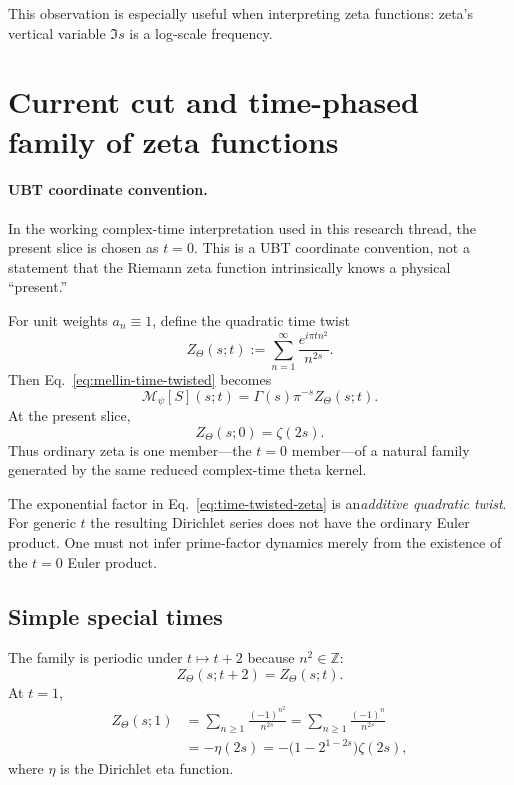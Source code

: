 This observation is especially useful when interpreting zeta functions: zeta's vertical
variable $\Im s$ is a log-scale frequency.

\section{Current cut and time-phased family of zeta functions}
\label{sec:time-twisted-zeta}

\paragraph{UBT coordinate convention.}
In the working complex-time interpretation used in this research thread, the present
slice is chosen as $t=0$.  This is a UBT coordinate convention, not a statement that the
Riemann zeta function intrinsically knows a physical ``present.''

For unit weights $a_n\equiv1$, define the quadratic time twist
\begin{equation}
  Z_\Theta(s;t)
  :=\sum_{n=1}^{\infty}
    \frac{e^{i\pi t n^2}}{n^{2s}}.
  \label{eq:time-twisted-zeta}
\end{equation}
Then Eq.~\eqref{eq:mellin-time-twisted} becomes
\begin{equation}
 \boxed{
  \mathcal M_\psi[S](s;t)
  =\Gamma(s)\pi^{-s}Z_\Theta(s;t).}
 \label{eq:mellin-Ztheta}
\end{equation}
At the present slice,
\begin{equation}
 \boxed{Z_\Theta(s;0)=\zeta(2s).}
 \label{eq:present-zeta}
\end{equation}
Thus ordinary zeta is one member---the $t=0$ member---of a natural family generated by
the same reduced complex-time theta kernel.

\begin{remark}
The exponential factor in Eq.~\eqref{eq:time-twisted-zeta} is an\emph{additive quadratic
twist}.  For generic $t$ the resulting Dirichlet series does not have the ordinary Euler
product.  One must not infer prime-factor dynamics merely from the existence of the
$t=0$ Euler product.
\end{remark}

\subsection{Simple special times}

The family is periodic under $t\mapsto t+2$ because $n^2\in\mathbb Z$:
\begin{equation}
 Z_\Theta(s;t+2)=Z_\Theta(s;t).
\end{equation}
At $t=1$,
\begin{align}
 Z_\Theta(s;1)
 &=\sum_{n\ge1}\frac{(-1)^{n^2}}{n^{2s}}
 =\sum_{n\ge1}\frac{(-1)^n}{n^{2s}}\\
 &=-\eta(2s)
 =-\bigl(1-2^{1-2s}\bigr)\zeta(2s),
 \label{eq:t1-eta}
\end{align}
where $\eta$ is the Dirichlet eta function.

